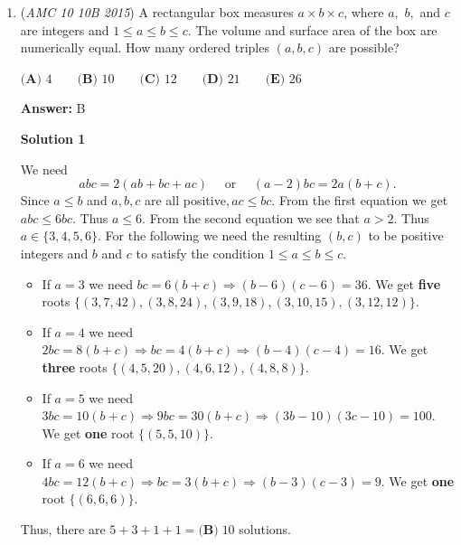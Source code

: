 \begin{enumerate}
 


	\item (\textit{AMC 10 10B 2015}) A rectangular box measures $a \times b \times c$, where $a,$ $b,$ and $c$ are integers and $1 \leq a \leq b \leq c$. The volume and surface area of the box are numerically equal. How many ordered triples $(a,b,c)$ are possible?


 $\textbf{(A) }4\qquad\textbf{(B) }10\qquad\textbf{(C) }12\qquad\textbf{(D) }21\qquad\textbf{(E) }26$

 \textbf{Answer: }B



\textbf{Solution 1}

We need 
 \[abc = 2(ab+bc+ac) \quad \text{ or } \quad (a-2)bc = 2a(b+c).\]Since $a\le b$ and $a,b,c$ are all positive$,ac \le bc$. From the first equation we get $abc \le 6bc$. Thus $a\le 6$. From the second equation we see that $a > 2$. Thus $a\in \{3, 4, 5, 6\}$. For the following we need the resulting $(b,c)$ to be positive integers and $b$ and $c$ to satisfy the condition $1\leq a \leq b \leq c.$

            \begin{itemize}
        \item If $a=3$ we need $bc = 6(b+c) \Rightarrow (b-6)(c-6)=36$. We get \textbf{five} roots $\{(3, 7, 42), (3, 8, 24), (3,9,18), (3, 10, 15), (3,12,12)\}$.
            \end{itemize}
            
            \begin{itemize}
        \item If $a=4$ we need $2bc = 8(b+c) \Rightarrow bc = 4(b+c) \Rightarrow (b-4)(c-4)=16$. We get \textbf{three} roots $\{(4,5,20), (4,6,12), (4,8,8)\}$.
            \end{itemize}
            
            \begin{itemize}
        \item If $a=5$ we need $3bc = 10(b+c) \Rightarrow 9bc=30(b+c) \Rightarrow (3b-10)(3c-10)=100$. We get \textbf{one} root $\{(5,5,10)\}$.
            \end{itemize}
            
            \begin{itemize}
        \item If $a=6$ we need $4bc = 12(b+c) \Rightarrow bc = 3(b+c) \Rightarrow (b-3)(c-3)=9$. We get \textbf{ one} root $\{(6,6,6)\}$.
            \end{itemize}
            Thus, there are $5+3+1+1 = \boxed{\textbf{(B)}\; 10}$ solutions.


\end{enumerate}

